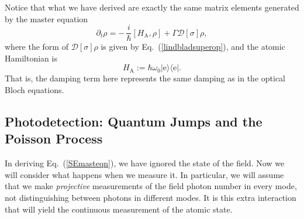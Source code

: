 \documentclass[12pt,aps,onecolum,superscriptaddress,footinbib,floatfix,showpacs]{revtex4-1}
\def\ket#1{|{#1}\rangle}
\def\bra#1{\langle{#1}|}
\def\HA{H_\mathrm{\scriptscriptstyle A}}
\begin{document}
Notice that what we have derived are exactly the same matrix elements generated
by the master equation
\begin{equation}
  \partial_t\rho = -\,\frac{i}{\hbar}[\HA,\rho] +\Gamma\mathcal{D}[\sigma]\rho,
  \label{SEmasteqn}
\end{equation}
where the form of $\mathcal{D}[\sigma]\rho$ is given by Eq.~(\ref{lindbladsuperop}),
and the atomic Hamiltonian is
\begin{equation}
  \HA := \hbar\omega_0 \ket{\mathrm{e}}\bra{\mathrm{e}}.
\end{equation}
That is, the damping term here represents the same damping
as in the optical Bloch equations.


\subsection{Photodetection: Quantum Jumps and the Poisson Process}\label{section:photodetection}

In deriving Eq.~(\ref{SEmasteqn}), we have ignored the
state of the field.  Now we will consider what happens when we measure
it.  In particular, we will assume that we make \textit{projective}
measurements of the field photon number in every mode, not distinguishing
between photons in different modes.
It is this extra interaction that will yield the continuous measurement
of the atomic state.
\end{document}
